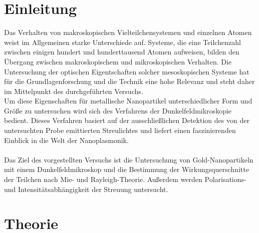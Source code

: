 \setcounter{page}{1}
\section*{Einleitung}
Das Verhalten von makroskopischen Vielteilchensystemen und einzelnen Atomen weist im Allgemeinen starke Unterschiede auf. Systeme, die eine Teilchenzahl zwischen einigen hundert und hunderttausend Atomen aufweisen, bilden den Übergang zwischen makroskopischem und mikroskopischen Verhalten. Die Untersuchung der optischen Eigentschaften solcher mesoskopischen Systeme hat für die Grundlagenforschung und die Technik eine hohe Relevanz und steht daher im Mittelpunkt des durchgeführten Versuchs.\\
Um diese Eigenschaften für metallische Nanopartikel unterschiedlicher Form und Größe zu untersuchen wird sich des Verfahrens der Dunkelfeldmikroskopie bedient. Dieses Verfahren basiert auf der ausschließlichen Detektion des von der untersuchten Probe emittierten Streulichtes und liefert einen faszinierenden Einblick in die Welt der Nanoplasmonik.\\
\\
Das Ziel des vorgestellten Versuchs ist die Untersuchung von Gold-Nanopartikeln mit einem Dunkelfeldmikroskop und die Bestimmung der Wirkungsquerschnitte der Teilchen nach Mie- und Rayleigh-Theorie. Außerdem werden Polarisations- und Intensitätsabhängigkeit der Streuung untersucht.\\

\newpage

\section{Theorie}

